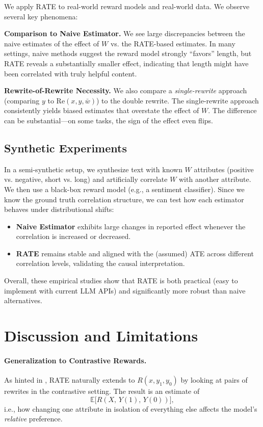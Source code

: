 \documentclass{article}
\theoremstyle{definition}
\newcommand{\E}{\mathbb{E}}
\begin{document}
We apply RATE to real-world reward models and real-world data. We observe several key phenomena:

\textbf{Comparison to Naive Estimator.} We see large discrepancies between the naive estimates of the effect of $W$ vs. the RATE-based estimates. In many settings, naive methods suggest the reward model strongly ``favors'' length, but RATE reveals a substantially smaller effect, indicating that length might have been correlated with truly helpful content.

\textbf{Rewrite-of-Rewrite Necessity.} We also compare a \emph{single-rewrite} approach (comparing $y$ to $\text{Re}(x, y, \bar{w})$) to the double rewrite. The single-rewrite approach consistently yields biased estimates that overstate the effect of $W$. The difference can be substantial---on some tasks, the sign of the effect even flips.

\subsection{Synthetic Experiments}

In a semi-synthetic setup, we synthesize text with known $W$ attributes (positive vs. negative, short vs. long) and artificially correlate $W$ with another attribute. We then use a black-box reward model (e.g., a sentiment classifier). Since we know the ground truth correlation structure, we can test how each estimator behaves under distributional shifts:
\begin{itemize}
    \item \textbf{Naive Estimator} exhibits large changes in reported effect whenever the correlation is increased or decreased.
    \item \textbf{RATE} remains stable and aligned with the (assumed) ATE across different correlation levels, validating the causal interpretation.
\end{itemize}

Overall, these empirical studies show that RATE is both practical (easy to implement with current LLM APIs) and significantly more robust than naive alternatives.

\section{Discussion and Limitations}
\label{sec:discussion}

\paragraph{Generalization to Contrastive Rewards.}
As hinted in , RATE naturally extends to $R(x, y_1, y_0)$ by looking at pairs of rewrites in the contrastive setting. The result is an estimate of
\[
\E\bigl[R(X,\,Y(1),\,Y(0))\bigr],
\]
i.e., how changing one attribute in isolation of everything else affects the model's \emph{relative} preference.
\end{document}
